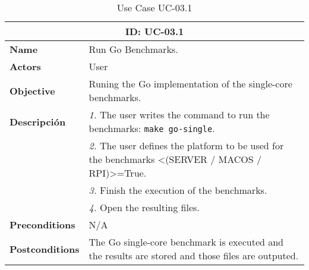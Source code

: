 \begin{table}[H]
    \centering
    \begin{tabular}{l p{10cm}}
        \toprule
        \multicolumn{2}{c}{\textbf{ID: UC-03.1}} \\
        \toprule
        \textbf{Name}                         &  Run Go Benchmarks. \\
        \textbf{Actors}                       &  User \\
        \textbf{Objective}                    &  Runing the Go implementation of the single-core benchmarks. \\
        \multirow{1}{*}{\textbf{Descripción}} & \textsl{1.} The user writes the command to run the benchmarks: \texttt{make go-single}.\\
                                              & \textsl{2.} The user defines the platform to be used for the benchmarks <(SERVER / MACOS / RPI)>=True.\\
                                              & \textsl{3.} Finish the execution of the benchmarks.\\
                                              & \textsl{4.} Open the resulting files.\\ 
        \textbf{Preconditions}                &  N/A \\
        \textbf{Postconditions}               &  The Go single-core benchmark is executed and the results are stored and those files are outputed. \\
    \end{tabular}
    \caption{Use Case UC-03.1}
    \label{tab:uc-03.1}
\end{table}

